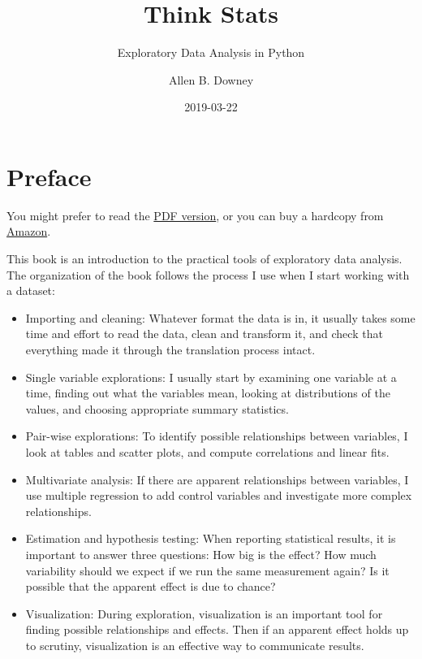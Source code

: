 \documentclass[]{book}
\title{Think Stats}
\subtitle{Exploratory Data Analysis in Python}
\author{Allen B. Downey}
\date{2019-03-22}
\providecommand{\tightlist}{%
  \setlength{\itemsep}{0pt}\setlength{\parskip}{0pt}}
\begin{document}
\maketitle

{
\setcounter{tocdepth}{1}
\tableofcontents
}
\hypertarget{preface}{%
\chapter*{Preface}\label{preface}}

You might prefer to read the \href{http://thinkstats2.com/thinkstats2.pdf}{PDF
version}, or you can buy a
hardcopy from \href{http://amzn.to/2gBBW7v}{Amazon}.

This book is an introduction to the practical tools of exploratory data
analysis. The organization of the book follows the process I use when I
start working with a dataset:

\begin{itemize}
\tightlist
\item
  Importing and cleaning: Whatever format the data is in, it usually
  takes some time and effort to read the data, clean and transform it,
  and check that everything made it through the translation process
  intact.
\item
  Single variable explorations: I usually start by examining one
  variable at a time, finding out what the variables mean, looking at
  distributions of the values, and choosing appropriate summary
  statistics.
\item
  Pair-wise explorations: To identify possible relationships between
  variables, I look at tables and scatter plots, and compute
  correlations and linear fits.
\item
  Multivariate analysis: If there are apparent relationships between
  variables, I use multiple regression to add control variables and
  investigate more complex relationships.
\item
  Estimation and hypothesis testing: When reporting statistical
  results, it is important to answer three questions: How big is the
  effect? How much variability should we expect if we run the same
  measurement again? Is it possible that the apparent effect is due to
  chance?
\item
  Visualization: During exploration, visualization is an important
  tool for finding possible relationships and effects. Then if an
  apparent effect holds up to scrutiny, visualization is an effective
  way to communicate results.
\end{itemize}
\end{document}
